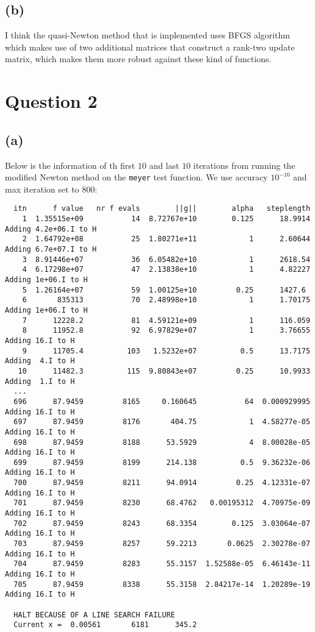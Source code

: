 \documentclass[a4paper, fleqn]{article}
\begin{document}
\subsection{(b)}
I think the quasi-Newton method that is implemented uses BFGS algorithm which makes use
of two additional matrices that construct a rank-two update matrix, which makes them more
robust against these kind of functions.

\section{Question 2}
\subsection{(a)}
Below is the information of th first $10$ and last $10$ iterations from running the
modified Newton method on the \texttt{meyer} test function. We use accuracy $10^{-10}$
and max iteration set to $800$:
\begin{verbatim}
  itn      f value   nr f evals        ||g||        alpha   steplength
    1  1.35515e+09           14  8.72767e+10        0.125      18.9914 Adding 4.2e+06.I to H
    2  1.64792e+08           25  1.80271e+11            1      2.60644 Adding 6.7e+07.I to H
    3  8.91446e+07           36  6.05482e+10            1      2618.54
    4  6.17298e+07           47  2.13838e+10            1      4.82227 Adding 1e+06.I to H
    5  1.26164e+07           59  1.00125e+10         0.25      1427.6
    6       835313           70  2.48998e+10            1      1.70175 Adding 1e+06.I to H
    7      12228.2           81  4.59121e+09            1      116.059
    8      11952.8           92  6.97829e+07            1      3.76655 Adding 16.I to H
    9      11705.4          103   1.5232e+07          0.5      13.7175 Adding  4.I to H
   10      11482.3          115  9.80843e+07         0.25      10.9933 Adding  1.I to H
  ...
  696      87.9459         8165     0.160645           64  0.000929995 Adding 16.I to H
  697      87.9459         8176       404.75            1  4.58277e-05 Adding 16.I to H
  698      87.9459         8188      53.5929            4  8.00028e-05 Adding 16.I to H
  699      87.9459         8199      214.138          0.5  9.36232e-06 Adding 16.I to H
  700      87.9459         8211      94.0914         0.25  4.12331e-07 Adding 16.I to H
  701      87.9459         8230      68.4762   0.00195312  4.70975e-09 Adding 16.I to H
  702      87.9459         8243      68.3354        0.125  3.03064e-07 Adding 16.I to H
  703      87.9459         8257      59.2213       0.0625  2.30278e-07 Adding 16.I to H
  704      87.9459         8283      55.3157  1.52588e-05  6.46143e-11 Adding 16.I to H
  705      87.9459         8338      55.3158  2.84217e-14  1.20289e-19 Adding 16.I to H

  HALT BECAUSE OF A LINE SEARCH FAILURE
  Current x =  0.00561       6181      345.2
\end{verbatim}
\end{document}
